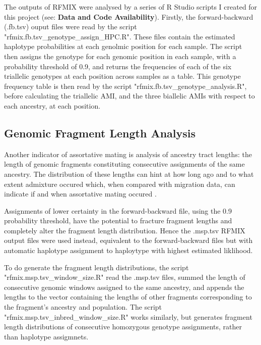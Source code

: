 \documentclass[11pt]{article}
\begin{document}
The outputs of RFMIX were analysed by a series of R Studio scripts I created for this project (see: \textbf{Data and Code Availability}). Firstly, the forward-backward (.fb.tsv) ouput files were read by the script "rfmix.fb.tsv\_genotype\_assign\_HPC.R". These files contain the estimated haplotype probabilities at each genolmic position for each sample. The script then assigns the genotype for each genomic position in each sample, with a probability threshold of 0.9, and returns the frequencies of each of the six triallelic genotypes at each position across samples as a table. This genotype frequency table is then read by the script "rfmix.fb.tsv\_genotype\_analysis.R", before calculating the triallelic AMI, and the three biallelic AMIs with respect to each ancestry, at each position.






\subsection{Genomic Fragment Length Analysis}

Another indicator of assortative mating is analysis of ancestry tract lengths: the length of genomic fragments constituting consecutive assignments of the same ancestry. The distribution of these lengths can hint at how long ago and to what extent admixture occured which, when compared with migration data, can indicate if and when assortative mating occured \parencite{Gravel2012}
.

Assignments of lower certainty in the forward-backward file, using the 0.9 probability threshold, have the potential to fracture fragment lengths and completely alter the fragment length distribution. Hence the .msp.tsv RFMIX output files were used instead, equivalent to the forward-backward files but with automatic haplotype assignment to haploytype with highest estimated liklihood.

To do generate the fragment length distributions, the script "rfmix.msp.tsv\_window\_size.R" read the .msp.tsv files, summed the length of consecutive genomic windows assigned to the same ancestry, and appends the lengths to the vector containing the lengths of other fragments corresponding to the fragment's ancestry and population. The script "rfmix.msp.tsv\_inbred\_window\_size.R" works similarly, but generates fragment length distributions of consecutive homozygous genotype assignments, rather than haplotype assigmnets. 
\end{document}
